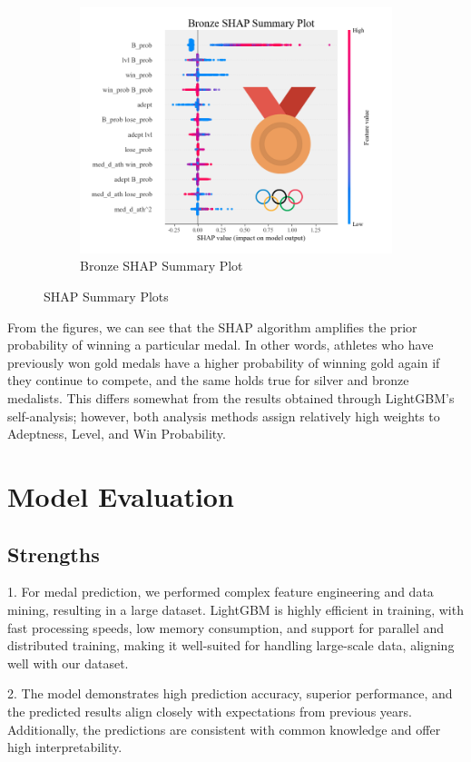 \documentclass[12pt]{article}  %
\begin{document}
\begin{figure}[H]
\begin{subfigure}[b]{.32\textwidth}
		\includegraphics[width=\textwidth]{img/shap3.png}
		\caption{Bronze SHAP Summary Plot}\label{subfig:3}
	\end{subfigure}
	\caption{SHAP Summary Plots}\label{fig:subfigures}
\end{figure}
From the figures, we can see that the SHAP algorithm amplifies the prior probability of winning a particular medal. In other words, athletes who have previously won gold medals have a higher probability of winning gold again if they continue to compete, and the same holds true for silver and bronze medalists. This differs somewhat from the results obtained through LightGBM's self-analysis; however, both analysis methods assign relatively high weights to Adeptness, Level, and Win Probability.

\section{Model Evaluation}
\subsection{Strengths}
1. For medal prediction, we performed complex feature engineering and data mining, resulting in a large dataset. LightGBM is highly efficient in training, with fast processing speeds, low memory consumption, and support for parallel and distributed training, making it well-suited for handling large-scale data, aligning well with our dataset.

2. The model demonstrates high prediction accuracy, superior performance, and the predicted results align closely with expectations from previous years. Additionally, the predictions are consistent with common knowledge and offer high interpretability.
\end{document}
